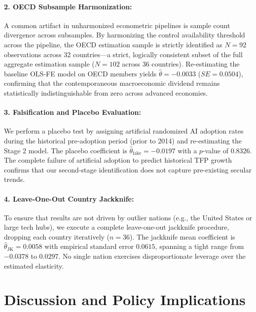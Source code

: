 \documentclass[11pt,a4paper]{article}
\begin{document}
\paragraph{2. OECD Subsample Harmonization:} A common artifact in unharmonized econometric pipelines is sample count divergence across subsamples. By harmonizing the control availability threshold across the pipeline, the OECD estimation sample is strictly identified as $N = 92$ observations across 32 countries---a strict, logically consistent subset of the full aggregate estimation sample ($N = 102$ across 36 countries). Re-estimating the baseline OLS-FE model on OECD members yields $\hat{\theta} = -0.0033$ ($SE = 0.0504$), confirming that the contemporaneous macroeconomic dividend remains statistically indistinguishable from zero across advanced economies.

\paragraph{3. Falsification and Placebo Evaluation:} We perform a placebo test by assigning artificial randomized AI adoption rates during the historical pre-adoption period (prior to 2014) and re-estimating the Stage 2 model. The placebo coefficient is $\hat{\theta}_{\text{fake}} = -0.0197$ with a $p$-value of $0.8326$. The complete failure of artificial adoption to predict historical TFP growth confirms that our second-stage identification does not capture pre-existing secular trends.

\paragraph{4. Leave-One-Out Country Jackknife:} To ensure that results are not driven by outlier nations (e.g., the United States or large tech hubs), we execute a complete leave-one-out jackknife procedure, dropping each country iteratively ($n = 36$). The jackknife mean coefficient is $\hat{\theta}_{\text{JK}} = 0.0058$ with empirical standard error $0.0615$, spanning a tight range from $-0.0378$ to $0.0297$. No single nation exercises disproportionate leverage over the estimated elasticity.

\section{Discussion and Policy Implications}
\label{sec:discussion}
\end{document}
